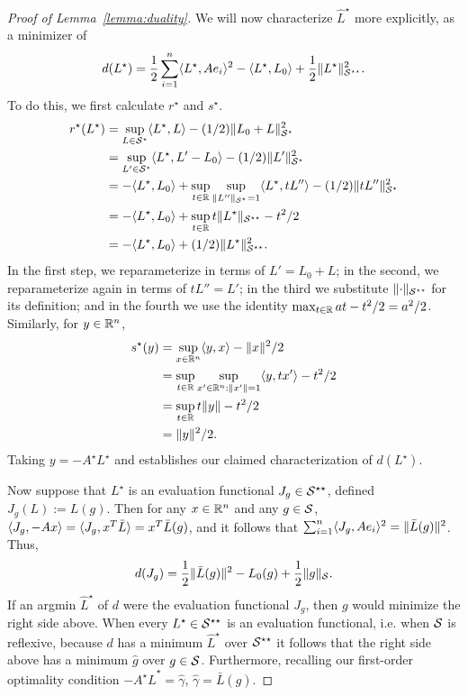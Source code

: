 \begin{proof}[Proof of Lemma~\ref{lemma:duality}]
We will now characterize $\hat L^{\star}$ more explicitly, as a minimizer of 
\[ d(L^{\star}) = \frac{1}{2}\sum_{i=1}^n \inner{L^{\star}, A e_i}^2  - \inner{L^{\star}, L_0}  + \frac{1}{2} \norm{L^{\star}}_{\S^{\star\star}}^2. \]
To do this, we first calculate $r^{\star}$ and $s^{\star}$.
\begin{align*}
r^{\star}(L^{\star}) 
&= \sup_{L \in \S^{\star}} \inner{L^{\star}, L} - (1/2)\norm{L_0 + L}_{\S^{\star}}^2 \\
&= \sup_{L' \in \S^{\star}} \inner{L^{\star}, L' - L_0} - (1/2)\norm{L'}_{\S^{\star}}^2 \\ 
&= -\inner{L^{\star}, L_0} + \sup_{t \in \R } \sup_{\norm{L''}_{\S^{\star}}=1} \inner{L^{\star},  t L''} - (1/2)\norm{tL''}_{\S^{\star}}^2 \\
&= -\inner{L^{\star}, L_0} + \sup_{t \in \R} t \norm{L^{\star}}_{\S^{\star\star}} - t^2/2 \\
&= -\inner{L^{\star}, L_0} + (1/2)\norm{L^{\star}}_{\S^{\star\star}}^2.
\end{align*}
In the first step, we reparameterize in terms of $L' = L_0 + L$; in the second, we reparameterize again in terms of $tL''=L'$; 
in the third we substitute $\norm{\cdot}_{\S^{\star\star}}$ for its definition; and in the fourth we use the identity $\max_{t \in \R} at - t^2/2 = a^2/2$.
Similarly, for $y \in \R^n$, 
\begin{align*}
s^{\star}(y) 
&= \sup_{x \in \R^n} \inner{y,x} - \norm{x}^2/2 \\
&= \sup_{t \in \R}\sup_{x' \in \R^n : \norm{x'}=1} \inner{y,tx'} - t^2/2 \\
&= \sup_{t \in \R}t\norm{y} - t^2/2 \\
&= \norm{y}^2/2.
\end{align*}
Taking $y=-A^{\star}L^{\star}$ and establishes our claimed characterization of $d(L^{\star})$.

Now suppose that $L^{\star}$ is an evaluation functional $J_{g} \in \S^{\star\star}$, defined $J_{g}(L) := L(g)$.
Then for any $x \in \R^n$ and any $g \in \S$, $\inner{J_{g}, -Ax} =  \inner{ J_{g}, x^T \bar L } = x^T \bar L(g)$,
and it follows that $\sum_{i=1}^n \inner{J_{g}, A e_i}^2 = \norm{\bar L(g)}^2$. Thus,
\[ d(J_{g}) = \frac{1}{2}\norm{\bar L(g)}^2  - L_0(g)  + \frac{1}{2} \norm{g}_{\S}. \]
If an argmin $\hat L^{\star}$ of $d$ were the evaluation functional $J_{g}$, 
then $g$ would minimize the right side above. When every $L^{\star} \in \S^{\star\star}$ is an evaluation functional,
i.e. when $\S$ is reflexive, because $d$ has a minimum $\hat L^{\star}$ over $\S^{\star\star}$ 
it follows that the right side above has a minimum $\hat g$ over $g \in \S$. 
Furthermore, recalling our first-order optimality condition $-A^{\star}\hat L^{\star} =  \hat \gamma$, 
$\hat \gamma = \bar L(\hat g)$.



\end{proof}

